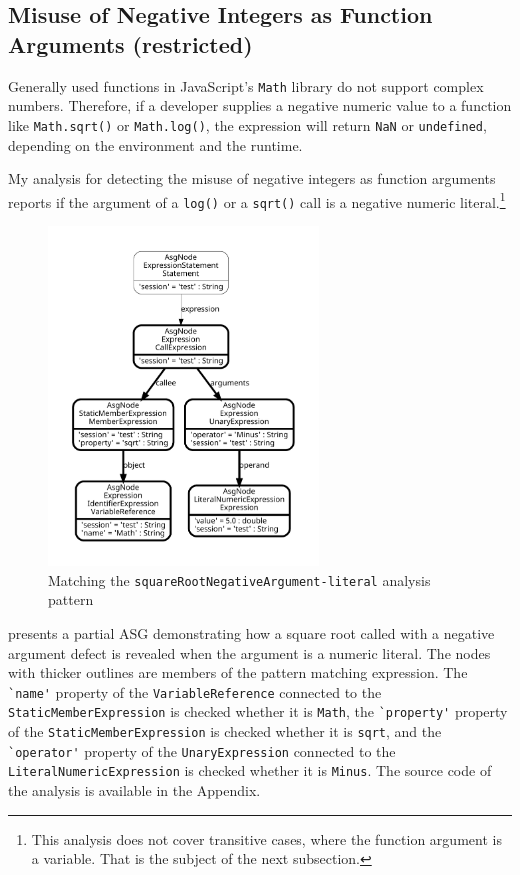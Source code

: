 \subsection{Misuse of Negative Integers as Function Arguments (restricted)}

Generally used functions in JavaScript's \lstinline{Math} library do not support complex numbers. Therefore, if a developer supplies a negative numeric value to a function like \lstinline{Math.sqrt()} or \lstinline{Math.log()}, the expression will return \lstinline{NaN} or \lstinline{undefined}, depending on the environment and the runtime.

My analysis for detecting the misuse of negative integers as function arguments reports if the argument of a \lstinline{log()} or a \lstinline{sqrt()} call is a negative numeric literal.\footnote{This analysis does not cover transitive cases, where the function argument is a variable. That is the subject of the next subsection.}

\begin{figure}[!htb]
	\centering
	\includegraphics[height=90mm, trim=12mm 12mm 12mm 12mm,clip]{figures/analysis_squareRootArgument.pdf}
	\caption{Matching the \lstinline{squareRootNegativeArgument-literal} analysis pattern}
	\label{fig:analysis-squarerootnegativeargument-simple}
\end{figure}

 presents a partial ASG demonstrating how a square root called with a negative argument defect is revealed when the argument is a numeric literal. The nodes with thicker outlines are members of the pattern matching expression. The \lstinline{`name'} property of the \lstinline{VariableReference} connected to the \lstinline{StaticMemberExpression} is checked whether it is \lstinline{Math}, the \lstinline{`property'} property of the \lstinline{StaticMemberExpression} is checked whether it is \lstinline{sqrt}, and the \lstinline{`operator'} property of the \lstinline{UnaryExpression} connected to the \lstinline{LiteralNumericExpression} is checked whether it is \lstinline{Minus}. The source code of the analysis is available in the Appendix.


